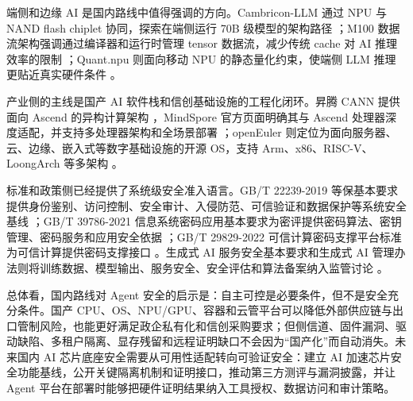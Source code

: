 端侧和边缘 AI 是国内路线中值得强调的方向。Cambricon-LLM 通过 NPU 与 NAND flash chiplet 协同，探索在端侧运行 70B 级模型的架构路径 \cite{cambriconllm2024}；M100 数据流架构强调通过编译器和运行时管理 tensor 数据流，减少传统 cache 对 AI 推理效率的限制 \cite{m100dataflow2026}；Quant.npu 则面向移动 NPU 的静态量化约束，使端侧 LLM 推理更贴近真实硬件条件 \cite{quantnpu2026}。

产业侧的主线是国产 AI 软件栈和信创基础设施的工程化闭环。昇腾 CANN 提供面向 Ascend 的异构计算架构 \cite{ascendcann2026}，MindSpore 官方页面明确其与 Ascend 处理器深度适配，并支持多处理器架构和全场景部署 \cite{mindspore2026}；openEuler 则定位为面向服务器、云、边缘、嵌入式等数字基础设施的开源 OS，支持 Arm、x86、RISC-V、LoongArch 等多架构 \cite{openeuler2026}。

标准和政策侧已经提供了系统级安全准入语言。GB/T 22239-2019 等保基本要求提供身份鉴别、访问控制、安全审计、入侵防范、可信验证和数据保护等系统安全基线 \cite{gbt22239_2019}；GB/T 39786-2021 信息系统密码应用基本要求为密评提供密码算法、密钥管理、密码服务和应用安全依据 \cite{gbt39786_2021}；GB/T 29829-2022 可信计算密码支撑平台标准为可信计算提供密码支撑接口 \cite{gbt29829_2022}。生成式 AI 服务安全基本要求和生成式 AI 管理办法则将训练数据、模型输出、服务安全、安全评估和算法备案纳入监管讨论 \cite{tc260genai2024,cacgenai2023}。

总体看，国内路线对 Agent 安全的启示是：自主可控是必要条件，但不是安全充分条件。国产 CPU、OS、NPU/GPU、容器和云管平台可以降低外部供应链与出口管制风险，也能更好满足政企私有化和信创采购要求；但侧信道、固件漏洞、驱动缺陷、多租户隔离、显存残留和远程证明缺口不会因为“国产化”而自动消失。未来国内 AI 芯片底座安全需要从可用性适配转向可验证安全：建立 AI 加速芯片安全功能基线，公开关键隔离机制和证明接口，推动第三方测评与漏洞披露，并让 Agent 平台在部署时能够把硬件证明结果纳入工具授权、数据访问和审计策略。
